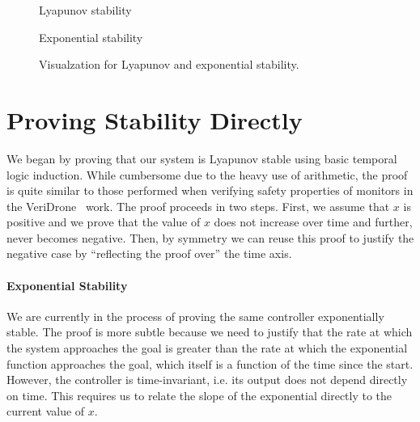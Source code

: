 \documentclass[preprint,nocopyrightspace]{sigplanconf}
\begin{document}
\begin{figure}
  \begin{minipage}{0.49\linewidth}
    \centering
  \resizebox{\linewidth}{!}{}

  \vspace{-0.5cm}
  Lyapunov stability
  \end{minipage}
  \begin{minipage}{0.49\linewidth}
  \centering
  \resizebox{\linewidth}{!}{}

  \vspace{-0.5cm}
  Exponential stability
  \end{minipage}

  \caption{Visualzation for Lyapunov and exponential stability.}
  \label{fig:stability}
\end{figure}

\vspace{-0.4cm}
\section{Proving Stability Directly}
\label{sec:graphical}

We began by proving that our system is Lyapunov stable using basic temporal logic induction.
While cumbersome due to the heavy use of arithmetic, the proof is quite similar to those performed when verifying safety properties of monitors in the VeriDrone~\cite{ricketts2015veridrone} work.
The proof proceeds in two steps.
First, we assume that $x$ is positive and we prove that the value of $x$ does not increase over time and further, never becomes negative.
Then, by symmetry we can reuse this proof to justify the negative case by ``reflecting the proof over'' the time axis.

\paragraph{Exponential Stability}
We are currently in the process of proving the same controller exponentially stable.
The proof is more subtle because we need to justify that the rate at which the system approaches the goal is greater than the rate at which the exponential function approaches the goal, which itself is a function of the time since the start.
However, the controller is time-invariant, i.e. its output does not depend directly on time.
This requires us to relate the slope of the exponential directly to the current value of $x$.
\end{document}
